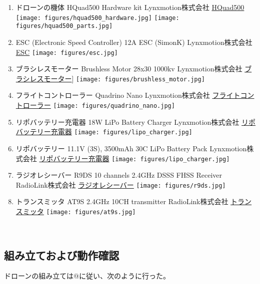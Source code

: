 \begin{enumerate}
\def\labelenumi{\arabic{enumi}.}
\item
  ドローンの機体 HQuad500 Hardware kit Lynxmotion株式会社
  \href{http://www.lynxmotion.com/p-1058-hquad500-hardware-only-kit.aspx}{HQuad500}
  \texttt{[image: figures/hquad500\_hardware.jpg]}
  \texttt{[image: figures/hquad500\_parts.jpg]}
\item
  ESC (Electronic Speed Controller) 12A ESC (SimonK) Lynxmotion株式会社
  \href{http://www.lynxmotion.com/p-915-12a-esc-simonk.aspx}{ESC}
  \texttt{[image: figures/esc.jpg]}
\item
  ブラシレスモーター Brushless Motor 28x30 1000kv Lynxmotion株式会社
  \href{http://www.lynxmotion.com/p-913-brushless-motor-28x30-1000kv.aspx}{ブラシレスモーター}{]}
  \texttt{[image: figures/brushless\_motor.jpg]}
\item
  フライトコントローラー Quadrino Nano Lynxmotion株式会社
  \href{http://www.lynxmotion.com/p-1020-lynxmotion-quadrino-nano-flight-controller-with-gps.aspx}{フライトコントローラー}
  \texttt{[image: figures/quadrino\_nano.jpg]}
\item
  リポバッテリー充電器 18W LiPo Battery Charger Lynxmotion株式会社
  \href{http://www.lynxmotion.com/p-985-18w-lipo-battery-charger.aspx}{リポバッテリー充電器}
  \texttt{[image: figures/lipo\_charger.jpg]}
\item
  リポバッテリー 11.1V (3S), 3500mAh 30C LiPo Battery Pack
  Lynxmotion株式会社
  \href{http://www.lynxmotion.com/p-985-18w-lipo-battery-charger.aspx}{リポバッテリー充電器}
  \texttt{[image: figures/lipo\_charger.jpg]}
\item
  ラジオレシーバー R9DS 10 channels 2.4GHz DSSS FHSS Receiver
  RadioLink株式会社
  \href{http://www.radiolink.com.cn/doce/product-detail-120.html}{ラジオレシーバー}
  \texttt{[image: figures/r9ds.jpg]}
\item
  トランスミッタ AT9S 2.4GHz 10CH transmitter RadioLink株式会社
  \href{http://www.radiolink.com.cn/doce/product-detail-119.html}{トランスミッタ}
  \texttt{[image: figures/at9s.jpg]}
\end{enumerate}

\
\subsection{組み立ておよび動作確認}\label{assembly-drone}

ドローンの組み立ては@に従い、次のように行った。

